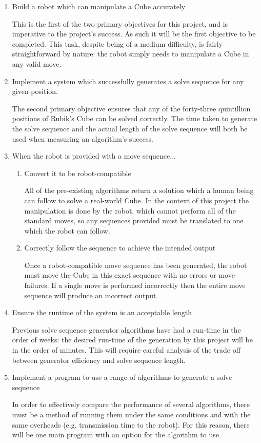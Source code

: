 \documentclass{report}
\begin{document}
    \begin{enumerate}
    	\item Build a robot which can manipulate a Cube accurately \par This is the first of the two primary objectives for this project, and is imperative to the project's success. As such it will be the first objective to be completed. This task, despite being of a medium difficulty, is fairly straightforward by nature: the robot simply needs to manipulate a Cube in any valid move.
    	\item Implement a system which successfully generates a solve sequence for any given position. \par The second primary objective ensures that any of the forty-three quintillion positions of Rubik's Cube can be solved correctly. The time taken to generate the solve sequence and the actual length of the solve sequence will both be used when measuring an algorithm's success.
    	\item When the robot is provided with a move sequence...
    	\begin{enumerate}
    		\item Convert it to be robot-compatible \par All of the pre-existing algorithms return a solution which a human being can follow to solve a real-world Cube. In the context of this project the manipulation is done by the robot, which cannot perform all of the standard moves, so any sequences provided must be translated to one which the robot can follow.
    		\item Correctly follow the sequence to achieve the intended output \par Once a robot-compatible move sequence has been generated, the robot must move the Cube in this exact sequence with no errors or move-failures. If a single move is performed incorrectly then the entire move sequence will produce an incorrect output.
    	\end{enumerate}
    	\item Ensure the runtime of the system is an acceptable length \par Previous solve sequence generator algorithms have had a run-time in the order of weeks: the desired run-time of the generation by this project will be in the order of minutes. This will require careful analysis of the trade off between generator efficiency and solve sequence length.
    	\item Implement a program to use a range of algorithms to generate a solve sequence \par In order to effectively compare the performance of several algorithms, there must be a method of running them under the same conditions and with the same overheads (e.g. transmission time to the robot). For this reason, there will be one main program with an option for the algorithm to use.

\end{enumerate}
\end{document}

